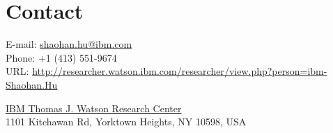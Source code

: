 
\section{\sc Contact}
\vspace{.01in}
{E-mail:} {\href{mailto:shaohan.hu@ibm.com}{shaohan.hu@ibm.com}}\\
{Phone:} +1 (413) 551-9674\\
{URL:} {\url{http://researcher.watson.ibm.com/researcher/view.php?person=ibm-Shaohan.Hu}}

{\href{http://www.research.ibm.com/labs/watson/}{IBM Thomas J. Watson Research Center}}\\
{1101 Kitchawan Rd, Yorktown Heights, NY 10598, USA}
